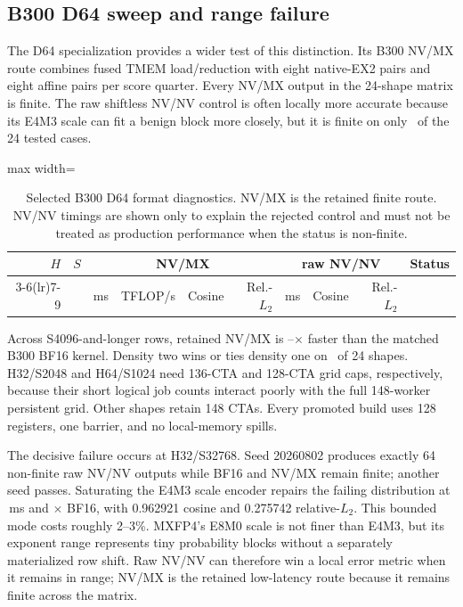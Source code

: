 \subsection{B300 D64 sweep and range failure}
\label{app:nvnv-d64}

The D64 specialization provides a wider test of this distinction. Its B300
NV/MX route combines fused TMEM load/reduction with eight native-EX2 pairs and
eight affine pairs per score quarter. Every NV/MX output in the 24-shape
matrix is finite. The raw shiftless NV/NV control is often locally more
accurate because its E4M3 scale can fit a benign block more closely, but it is
finite on only \BThreeDsixtyfourNVNVFiniteCases\ of the 24 tested cases.

\begin{table}[htbp]
\centering
\caption{Selected B300 D64 format diagnostics. NV/MX is the retained finite
route. NV/NV timings are shown only to explain the rejected control and must
not be treated as production performance when the status is non-finite.}
\label{tab:b300-d64-diagnostic}
\scriptsize
\begin{adjustbox}{max width=\textwidth}
\begin{tabular}{rrrrrrrrrl}
\toprule
$H$ & $S$ & \multicolumn{4}{c}{NV/MX} & \multicolumn{3}{c}{raw NV/NV} & Status \\
\cmidrule(lr){3-6}\cmidrule(lr){7-9}
 & & ms & TFLOP/s & Cosine & Rel.-$L_2$ & ms & Cosine & Rel.-$L_2$ & \\
\midrule
%
\end{tabular}
\end{adjustbox}
\end{table}
\FloatBarrier

Across S4096-and-longer rows, retained NV/MX is
\BThreeDsixtyfourMinSpeedup--\BThreeDsixtyfourMaxSpeedup$\times$ faster than
the matched B300 BF16 kernel. Density two wins or ties density one on
\BThreeDsixtyfourDensityWins\ of 24 shapes. H32/S2048 and H64/S1024 need
136-CTA and 128-CTA grid caps, respectively, because their short logical job
counts interact poorly with the full 148-worker persistent grid. Other shapes
retain 148 CTAs. Every promoted build uses 128 registers, one barrier, and no
local-memory spills.

The decisive failure occurs at H32/S32768. Seed 20260802 produces exactly 64
non-finite raw NV/NV outputs while BF16 and NV/MX remain finite; another seed
passes. Saturating the E4M3 scale encoder repairs the failing distribution at
\BThreeDsixtyfourBoundedNVNVTime\,ms and
\BThreeDsixtyfourBoundedNVNVSpeedup$\times$ BF16, with 0.962921 cosine and
0.275742 relative-$L_2$. This bounded mode costs roughly 2--3\%. MXFP4's E8M0
scale is not finer than E4M3, but its exponent range represents tiny
probability blocks without a separately materialized row shift. Raw NV/NV can
therefore win a local error metric when it remains in range; NV/MX is the
retained low-latency route because it remains finite across the matrix.

